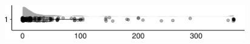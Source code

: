 \documentclass[
]{article}
\begin{document}
\begin{minipage}[t]{0.3\linewidth}

~

\end{minipage}%
\begin{minipage}[t]{0.7\linewidth}

\includegraphics[width=396px]{codebook_template_files/figure-latex/q7_26_rainplot-1}

\end{minipage}
 \vspace*{-6mm} 

\begin{minipage}[t]{0.3\linewidth}

~

\end{minipage}%
\begin{minipage}[t]{0.7\linewidth}

~

\end{minipage}
 \vspace*{-4mm} 
\end{document}
